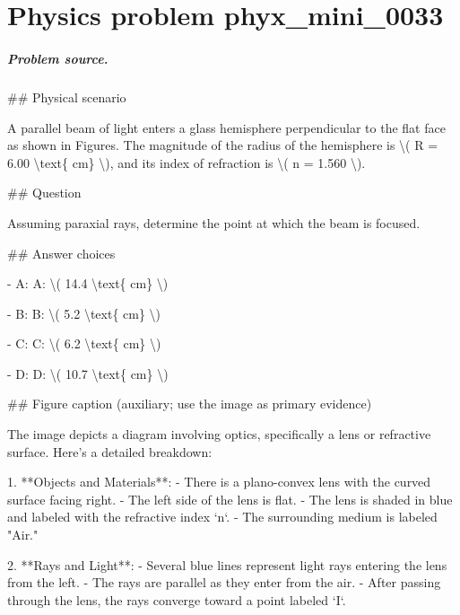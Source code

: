 
\chapter{Physics problem phyx\_mini\_0033}
\label{ch:PhyXMiniProblems_problem_phyx_mini_0033}

\paragraph{Problem source.}
\#\# Physical scenario

A parallel beam of light enters a glass hemisphere perpendicular to the flat face as shown in Figures. The magnitude of the radius of the hemisphere is \textbackslash{}( R = 6.00 \textbackslash{}text\{ cm\} \textbackslash{}), and its index of refraction is \textbackslash{}( n = 1.560 \textbackslash{}).

\#\# Question

Assuming paraxial rays, determine the point at which the beam is focused.

\#\# Answer choices

- A: A: \textbackslash{}( 14.4 \textbackslash{}text\{ cm\} \textbackslash{})

- B: B: \textbackslash{}( 5.2 \textbackslash{}text\{ cm\} \textbackslash{})

- C: C: \textbackslash{}( 6.2 \textbackslash{}text\{ cm\} \textbackslash{})

- D: D: \textbackslash{}( 10.7 \textbackslash{}text\{ cm\} \textbackslash{})

\#\# Figure caption (auxiliary; use the image as primary evidence)

The image depicts a diagram involving optics, specifically a lens or refractive surface. Here's a detailed breakdown:

1. **Objects and Materials**:
   - There is a plano-convex lens with the curved surface facing right.
   - The left side of the lens is flat.
   - The lens is shaded in blue and labeled with the refractive index `n`.
   - The surrounding medium is labeled "Air."

2. **Rays and Light**:
   - Several blue lines represent light rays entering the lens from the left.
   - The rays are parallel as they enter from the air.
   - After passing through the lens, the rays converge toward a point labeled `I`.

